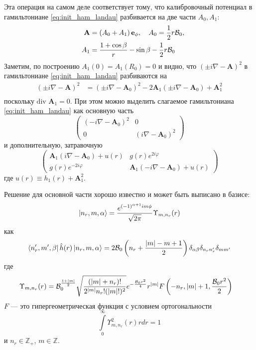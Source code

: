 \documentclass[a4paper,article,14pt]{extarticle}
\begin{document}
Эта операция на самом деле соответствует тому, что калибровочный потенциал в гамильтониане \eqref{eq:init_ham_landau} разбивается на две части $A_0,A_1$:
\begin{equation}
\begin{aligned}
\mathbf{A}  & = \left(A_0 + A_1  \right) \mathbf{e}_\phi, \quad A_0 =   \frac 1 2 r {\cal B}_{0} ,    \\
\quad A_1 & = \frac{1+  \cos\beta } { r } - \sin \beta - \frac 1 2 r {\cal B}_{0}     \\
\end{aligned}
\label{eq:devide_2_hamilte}
\end{equation}
Заметим, по построению $A_{1}(0) = A_{1}(R_{0}) = 0 $ и  видно, что $(\pm i \nabla - \mathbf{A} ) ^ 2$  в гамильтониане \eqref{eq:init_ham_landau} разбиваются на
\begin{equation}
\begin{aligned}
(\pm i \nabla - \mathbf{A} ) ^ 2 & = (\pm i \nabla - \mathbf{A}_0 ) ^ 2 - 
2 \mathbf{A}_1  (\pm i \nabla - \mathbf{A}_0 )+ \mathbf{A}_1^2   \\
\end{aligned}
\end{equation}
поскольку $ \mbox{div } \mathbf{A}_1=0$. 
При этом  можно выделить слагаемое гамильтониана \eqref{eq:init_ham_landau} как основную часть
$$
\begin{pmatrix} ( -i \nabla - \mathbf{A}_0 ) ^ 2 & 0 \\ 0 & ( i \nabla - \mathbf{A}_0 ) ^ 2 \end{pmatrix}
$$
и дополнительную, затравочную
$$
\begin{pmatrix} \mathbf{A}_1  (i \nabla - \mathbf{A}_0 ) + u(r) & g (r) e^{2 i  \varphi} \\ g (r) e^{-2 i  \varphi} & \mathbf{A}_1  (-i \nabla - \mathbf{A}_0 ) + u(r) \end{pmatrix}
$$ 
где $u(r) \equiv  h_1(r) + \mathbf{A}_1^2$. 

Решение для основной части хорошо известно и может быть выписано в базисе:
\begin{equation}
\label{eq:basis_func_landau}
\ket{n_r, m, \alpha} = \frac{e^{(-1)^{\alpha+1}  i m \phi}} {\sqrt{2 \pi}} \Upsilon_{m,n_r} (r)
\end{equation}
как
$$
\bra{n_r', m', \beta} \hat h (r)  \ket{n_r, m, \alpha} = 2 {\cal B}_{0} \left( n_r + \frac{|m| - m + 1}{2} \right) \delta_{\alpha \beta} \delta_{n_r n'_r} \delta_{m m'} 
$$
\noindent где  
\begin{equation}
\begin{aligned}
\Upsilon_{m, n_r} (r) & = {\cal B}_{0}^{\frac{1+|m|}{2}} \sqrt{\frac{(|m| + n_r)!}{2^{|m|}n_r!(|m|!)^2}} e^{-\frac{{\cal B}_{0} r^2}{4}} r^{|m|} F\left(-n_r,|m| + 1,\frac{{\cal B}_{0} r^2 }{2} \right) 
\end{aligned}
\end{equation}
\noindent $F$  --- это гипергеометрическая функция с условием ортогональности 
$$ \int\limits_0^\infty \Upsilon_{m, n_r}^2 (r) r dr = 1$$
и $n_r \in \mathbb{Z}_+$, $m \in \mathbb{Z}$.
\end{document}
